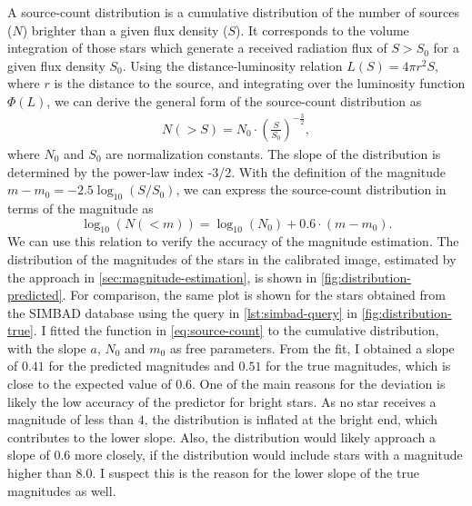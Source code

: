 A source-count distribution is a cumulative distribution of the number of sources ($N$)
brighter than a given flux density ($S$). It corresponds to the volume integration of
those stars which generate a received radiation flux of $S > S_0$ for a given flux density
$S_0$. Using the distance-luminosity relation $L(S) = 4 \pi r^2 S$, where $r$ is the
distance to the source, and integrating over the luminosity function $\Phi(L)$, we can
derive the general form of the source-count distribution as
\begin{align*}
  N(> S) = N_0 \cdot \left(\frac{S}{S_0}\right)^{-\frac{3}{2}},
\end{align*}
where $N_0$ and $S_0$ are normalization constants. The slope of the distribution is
determined by the power-law index -3/2. With the definition of the magnitude $m - m_0 =
  -2.5 \log_{10}{(S/S_0)}$, we can express the source-count distribution in terms of the
magnitude as
\begin{equation}
  \log_{10}{(N(< m))} = \log_{10}{(N_0)} + 0.6 \cdot (m - m_0).
  \label{eq:source-count}
\end{equation}
We can use this relation to verify the accuracy of the magnitude estimation. The
distribution of the magnitudes of the stars in the calibrated image, estimated by the
approach in \autoref{sec:magnitude-estimation}, is shown in
\autoref{fig:distribution-predicted}. For comparison, the same plot is shown for the stars
obtained from the SIMBAD database using the query in \autoref{lst:simbad-query} in
\autoref{fig:distribution-true}. I fitted the function in \autoref{eq:source-count} to the
cumulative distribution, with the slope $a$, $N_0$ and $m_0$ as free parameters. From the
fit, I obtained a slope of $0.41$ for the predicted magnitudes and $0.51$ for the true
magnitudes, which is close to the expected value of $0.6$. One of the main reasons for the
deviation is likely the low accuracy of the predictor for bright stars. As no star
receives a magnitude of less than $4$, the distribution is inflated at the bright end,
which contributes to the lower slope. Also, the distribution would likely approach a slope
of $0.6$ more closely, if the distribution would include stars with a magnitude higher
than 8.0. I suspect this is the reason for the lower slope of the true magnitudes as well.

